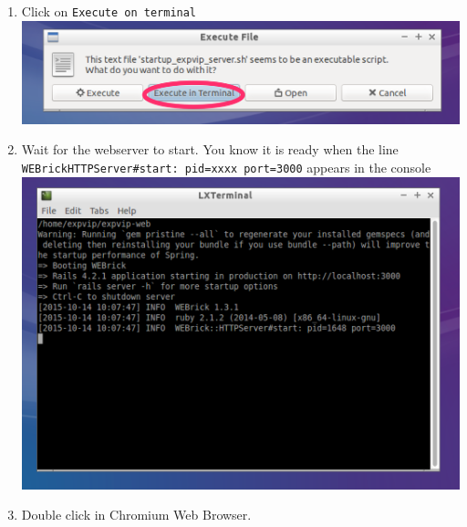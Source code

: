 \begin{enumerate}
\item
  Click on \lstinline!Execute on terminal!
  \includegraphics{images/StartupServer02.png}
\item
  Wait for the webserver to start. You know it is ready when the line
  \lstinline!WEBrickHTTPServer#start: pid=xxxx port=3000! appears in the
  console \includegraphics{images/StartupServer03.png}
\item
  Double click in Chromium Web Browser.

\end{enumerate}
